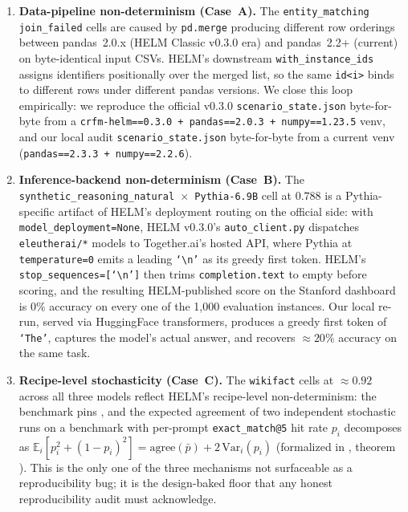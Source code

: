 \documentclass[11pt]{article}
\begin{document}
\begin{enumerate}
  \item \textbf{Data-pipeline non-determinism (Case~A).}
        The \texttt{entity\_matching} \texttt{join\_failed} cells are
        caused by \texttt{pd.merge} producing different row orderings
        between pandas~2.0.x (HELM Classic v0.3.0 era) and pandas~2.2+
        (current) on byte-identical input CSVs.
        HELM's downstream \texttt{with\_instance\_ids} assigns
        identifiers positionally over the merged list, so the same
        \texttt{id<i>} binds to different rows under different pandas
        versions.
        We close this loop empirically: we reproduce the official
        v0.3.0 \texttt{scenario\_state.json} byte-for-byte from a
        \texttt{crfm-helm==0.3.0 + pandas==2.0.3 + numpy==1.23.5} venv,
        and our local audit \texttt{scenario\_state.json} byte-for-byte
        from a current venv (\texttt{pandas==2.3.3 + numpy==2.2.6}).
  \item \textbf{Inference-backend non-determinism (Case~B).}
        The \texttt{synthetic\_reasoning\_natural~$\times$~Pythia-6.9B}
        cell at $0.788$ is a Pythia-specific artifact of HELM's
        deployment routing on the official side: with
        \texttt{model\_deployment=None}, HELM v0.3.0's
        \texttt{auto\_client.py} dispatches \texttt{eleutherai/*}
        models to Together.ai's hosted API, where Pythia at
        \texttt{temperature=0} emits a leading
        \texttt{`\textbackslash n'} as its greedy first token.
        HELM's \texttt{stop\_sequences=[`\textbackslash n']} then
        trims \texttt{completion.text} to empty before scoring, and
        the resulting HELM-published score on the Stanford dashboard
        is $0\%$ accuracy on every one of the 1{,}000 evaluation
        instances.
        Our local re-run, served via HuggingFace transformers,
        produces a greedy first token of \texttt{`The'}, captures the
        model's actual answer, and recovers $\approx 20\%$ accuracy on
        the same task.
  \item \textbf{Recipe-level stochasticity (Case~C).}
        The \texttt{wikifact} cells at $\approx 0.92$ across all three
        models reflect HELM's recipe-level non-determinism: the
        benchmark pins , and
        the expected agreement of two independent stochastic runs on
        a benchmark with per-prompt \texttt{exact\_match@5} hit rate
        $p_i$ decomposes as
        $\mathbb{E}_i[p_i^2 + (1-p_i)^2]
        = \text{agree}(\bar p) + 2\,\mathrm{Var}_i(p_i)$
        (formalized in
        , theorem
        ).
        This is the only one of the three mechanisms not surfaceable as
        a reproducibility bug; it is the design-baked floor that any
        honest reproducibility audit must acknowledge.
\end{enumerate}
\end{document}

